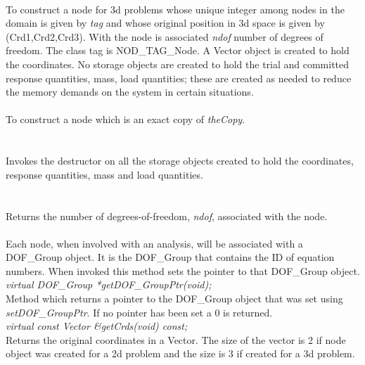 \\
To construct a node for 3d problems whose unique integer among nodes in the
domain is given by {\em tag} and whose original position in 3d space
is given by (Crd1,Crd2,Crd3). With the node is associated {\em ndof} number
of degrees of freedom. The class tag is NOD\_TAG\_Node. A Vector object
is created to hold the coordinates. No
storage objects are created to hold the trial and committed response
quantities, mass, load quantities; these are created as needed to
reduce the memory demands on the system in certain situations. \\ 



\\
To construct a node which is an exact copy of {\em theCopy}. \\

  \\
 \\
Invokes the destructor on all the storage objects created to hold the coordinates,
response quantities, mass and load quantities. \\

  \\
\\
Returns the number of degrees-of-freedom, {\em ndof}, associated with
the node. \\

 \\
Each node, when involved with an analysis, will be associated with a
DOF\_Group object. It is the DOF\_Group that contains the ID of equation
numbers. When invoked this method sets the pointer to that DOF\_Group object. \\

{\em virtual DOF\_Group *getDOF\_GroupPtr(void);} \\
Method which returns a pointer to the DOF\_Group object that was set
using {\em setDOF\_GroupPtr}. If no pointer has been set a $0$ is
returned. \\

{\em virtual const Vector \&getCrds(void) const;}  \\
Returns the original coordinates in a Vector. The size of the vector
is 2 if node object was created for a 2d problem and the size is 3 if
created for a 3d problem. \\

